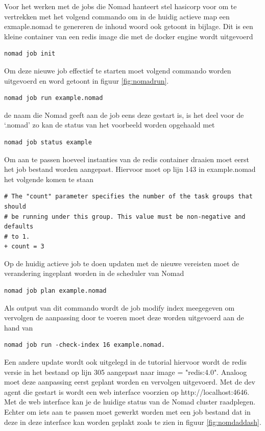 Voor het werken met de jobs die Nomad hanteert stel hasicorp voor om te vertrekken met het volgend commando om in de huidig actieve map een exmaple.nomad te genereren de inhoud woord ook getoont in bijlage. Dit is een kleine container van een redis image die met de docker engine wordt uitgevoerd
\begin{verbatim}
nomad job init
\end{verbatim}
Om deze nieuwe job effectief te starten moet volgend commando worden uitgevoerd en word getoont in figuur \ref{fig:nomadrun}.
\begin{verbatim}
nomad job run example.nomad
\end{verbatim}
de naam die Nomad geeft aan de job eens deze gestart is, is het deel voor de ‘.nomad’ zo kan de status van het voorbeeld worden opgehaald met
\begin{verbatim}
nomad job status example
\end{verbatim}
Om aan te passen hoeveel instanties van de redis container draaien moet eerst het job bestand worden aangepast. Hiervoor moet op lijn 143 in example.nomad het volgende komen te staan
\begin{verbatim}
# The "count" parameter specifies the number of the task groups that should
# be running under this group. This value must be non-negative and defaults
# to 1.
+ count = 3
\end{verbatim}
Op de huidig actieve job te doen updaten met de nieuwe vereisten moet de verandering ingeplant worden in de scheduler van Nomad
\begin{verbatim}
nomad job plan example.nomad
\end{verbatim}
Als output van dit commando wordt de job modify index meegegeven om vervolgen de aanpassing door te voeren moet deze worden uitgevoerd aan de hand van
\begin{verbatim}
nomad job run -check-index 16 example.nomad.
\end{verbatim}
Een andere update wordt ook uitgelegd in de tutorial hiervoor wordt de redis versie in het bestand op lijn 305 aangepast naar image = "redis:4.0". Analoog moet deze aanpassing eerst geplant worden en vervolgen uitgevoerd.
Met de dev agent die gestart is wordt een web interface voorzien op http://localhost:4646. Met de web interface kan je de huidige status van de Nomad cluster raadplegen. Echter om iets aan te passen moet gewerkt worden met een job bestand dat in deze in deze interface kan worden geplakt zoals te zien in figuur \ref{fig:nomdaddash}.

